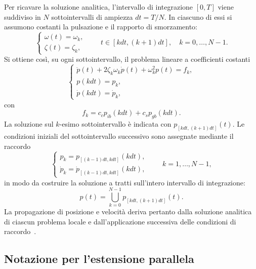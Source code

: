 Per ricavare la soluzione analitica, l'intervallo di integrazione $[0,T]$ viene suddiviso in $N$ sottointervalli di ampiezza $dt=T/N$. In ciascuno di essi si assumono costanti la pulsazione e il rapporto di smorzamento:
\begin{equation}
\begin{cases}
 \omega(t)=\omega_k,\\
 \zeta(t)=\zeta_k,
\end{cases}
\qquad t\in[kdt,(k+1)dt],\quad k=0,\ldots,N-1.
\label{eq:or-piecewise}
\end{equation}
Si ottiene cos\`i, su ogni sottointervallo, il problema lineare a coefficienti costanti
\begin{equation}
\begin{cases}
 \ddot p(t)+2\zeta_k\omega_k\dot p(t)+\omega_k^2p(t)=f_k,\\
 p(kdt)=p_k,\\
 \dot p(kdt)=\dot p_k,
\end{cases}
\label{eq:or-local}
\end{equation}
con
\begin{equation}
 f_k=c_c p_{ib}(kdt)+c_s p_{gb}(kdt).
 \label{eq:or-force-printed}
\end{equation}
La soluzione sul $k$-esimo sottointervallo \`e indicata con $p_{[kdt,(k+1)dt]}(t)$. Le condizioni iniziali del sottointervallo successivo sono assegnate mediante il raccordo
\begin{equation}
\begin{cases}
 p_k=p_{[(k-1)dt,kdt]}(kdt),\\
 \dot p_k=\dot p_{[(k-1)dt,kdt]}(kdt),
\end{cases}
\qquad k=1,\ldots,N-1,
\label{eq:or-matching}
\end{equation}
in modo da costruire la soluzione a tratti sull'intero intervallo di integrazione:
\begin{equation}
 p(t)=\bigcup_{k=0}^{N-1}p_{[kdt,(k+1)dt]}(t).
 \label{eq:or-piecewise-solution}
\end{equation}
La propagazione di posizione e velocit\`a deriva pertanto dalla soluzione analitica di ciascun problema locale e dall'applicazione successiva delle condizioni di raccordo~\citep{orlando2020analytic}.

\subsection{Notazione per l'estensione parallela}
\label{subsec:cpso-implementation}

